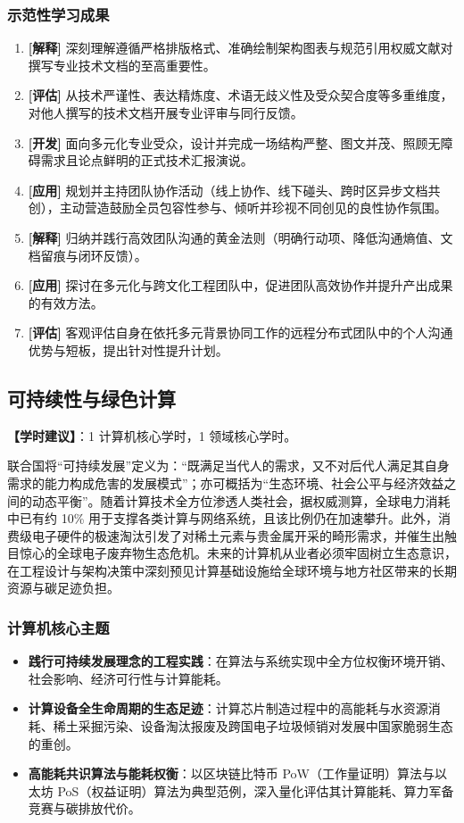 \subsubsection{示范性学习成果}
\begin{enumerate}
    \item \textbf{[解释]} 深刻理解遵循严格排版格式、准确绘制架构图表与规范引用权威文献对撰写专业技术文档的至高重要性。
    \item \textbf{[评估]} 从技术严谨性、表达精炼度、术语无歧义性及受众契合度等多重维度，对他人撰写的技术文档开展专业评审与同行反馈。
    \item \textbf{[开发]} 面向多元化专业受众，设计并完成一场结构严整、图文并茂、照顾无障碍需求且论点鲜明的正式技术汇报演说。
    \item \textbf{[应用]} 规划并主持团队协作活动（线上协作、线下碰头、跨时区异步文档共创），主动营造鼓励全员包容性参与、倾听并珍视不同创见的良性协作氛围。
    \item \textbf{[解释]} 归纳并践行高效团队沟通的黄金法则（明确行动项、降低沟通熵值、文档留痕与闭环反馈）。
        \item \textbf{[应用]} 探讨在多元化与跨文化工程团队中，促进团队高效协作并提升产出成果的有效方法。
    \item \textbf{[评估]} 客观评估自身在依托多元背景协同工作的远程分布式团队中的个人沟通优势与短板，提出针对性提升计划。
\end{enumerate}

\subsection{可持续性与绿色计算}
\textbf{【学时建议】}：1 计算机核心学时，1 领域核心学时。

联合国将“可持续发展”定义为：“既满足当代人的需求，又不对后代人满足其自身需求的能力构成危害的发展模式”；亦可概括为“生态环境、社会公平与经济效益之间的动态平衡”。随着计算技术全方位渗透人类社会，据权威测算，全球电力消耗中已有约 10\% 用于支撑各类计算与网络系统，且该比例仍在加速攀升。此外，消费级电子硬件的极速淘汰引发了对稀土元素与贵金属开采的畸形需求，并催生出触目惊心的全球电子废弃物生态危机。未来的计算机从业者必须牢固树立生态意识，在工程设计与架构决策中深刻预见计算基础设施给全球环境与地方社区带来的长期资源与碳足迹负担。

\subsubsection{计算机核心主题}
\begin{itemize}
    \item \textbf{践行可持续发展理念的工程实践}：在算法与系统实现中全方位权衡环境开销、社会影响、经济可行性与计算能耗。
    \item \textbf{计算设备全生命周期的生态足迹}：计算芯片制造过程中的高能耗与水资源消耗、稀土采掘污染、设备淘汰报废及跨国电子垃圾倾销对发展中国家脆弱生态的重创。
    \item \textbf{高能耗共识算法与能耗权衡}：以区块链比特币 PoW（工作量证明）算法与以太坊 PoS（权益证明）算法为典型范例，深入量化评估其计算能耗、算力军备竞赛与碳排放代价。
\end{itemize}

